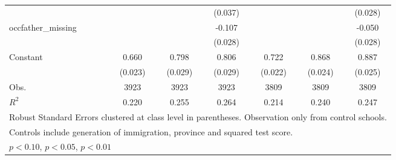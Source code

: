\begin{table}[htbp]
\begin{tabular}{l*{6}{c}}
                    &                     &                     &     (0.037)         &                     &                     &     (0.028)         \\
occfather\_missing   &                     &                     &      -0.107\sym{***}&                     &                     &      -0.050\sym{*}  \\
                    &                     &                     &     (0.028)         &                     &                     &     (0.028)         \\
Constant            &       0.660\sym{***}&       0.798\sym{***}&       0.806\sym{***}&       0.722\sym{***}&       0.868\sym{***}&       0.887\sym{***}\\
                    &     (0.023)         &     (0.029)         &     (0.029)         &     (0.022)         &     (0.024)         &     (0.025)         \\
\midrule
Obs.                &        3923         &        3923         &        3923         &        3809         &        3809         &        3809         \\
\(R^{2}\)           &       0.220         &       0.255         &       0.264         &       0.214         &       0.240         &       0.247         \\
\bottomrule
\multicolumn{7}{l}{\footnotesize Robust Standard Errors clustered at class level in parentheses. Observation only from control schools.}\\
\multicolumn{7}{l}{\footnotesize Controls include generation of immigration, province and squared test score.}\\
\multicolumn{7}{l}{\footnotesize \sym{*} \(p<0.10\), \sym{**} \(p<0.05\), \sym{***} \(p<0.01\)}\\
\end{tabular}
\end{table}
